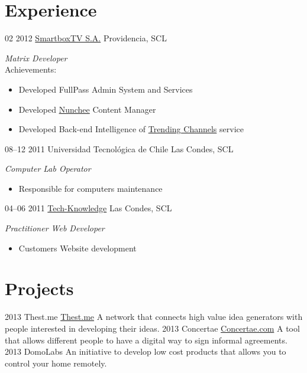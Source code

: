 \documentclass[]{friggeri-cv}
\begin{document}
\section{Experience}

\begin{entrylist}
  \entry
    {02 2012}
    {\href{http://www.smartboxtv.com}{SmartboxTV S.A.}}
    {Providencia, SCL}
    {\emph{Matrix Developer} \\
      Achievements:
      \begin{itemize}
        \item Developed FullPass Admin System and Services
        \item Developed {\href{http://www.nunchee.com}{Nunchee}} Content Manager
        \item Developed Back-end Intelligence of {\href{http://www.smartboxtv.com/products/twitv/}{Trending Channels}} service
      \end{itemize}}
  \entry
    {08--12 2011}
    {Universidad Tecnológica de Chile}
    {Las Condes, SCL}
    {\emph{Computer Lab Operator}
      \begin{itemize}
        \item Responsible for computers maintenance
      \end{itemize}}
  \entry
    {04--06 2011}
    {\href{http://www.techk.cl/}{Tech-Knowledge}}
    {Las Condes, SCL}
    {\emph{Practitioner Web Developer}
      \begin{itemize}
        \item Customers Website development
      \end{itemize}}
\end{entrylist}

\section{Projects}

\begin{entrylist}
  \entry
    {2013}
    {Thest.me}
    {\href{http://thest.me}{Thest.me}}
    {A network that connects high value idea generators with people interested in developing their ideas.}
  \entry
    {2013}
    {Concertae}
    {\href{http://concertae.com}{Concertae.com}}
    {A tool that allows different people to have a digital way to sign informal agreements.}
  \entry
    {2013}
    {DomoLabs}
    { }
    {An initiative to develop low cost products that allows you to control your home remotely.}
\end{entrylist}
\end{document}
